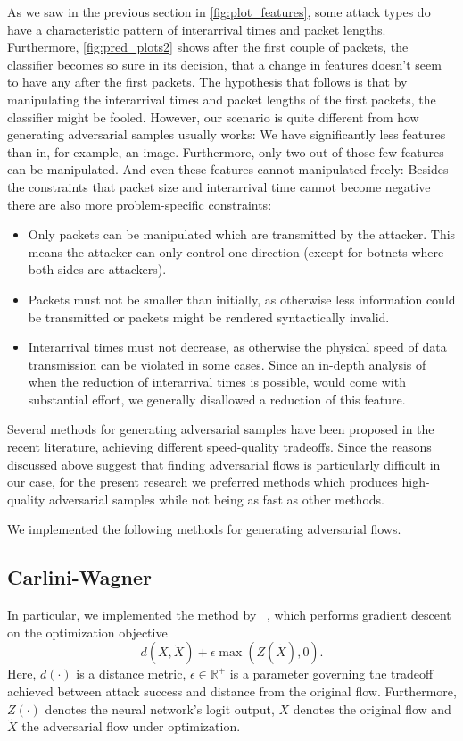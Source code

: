 \documentclass[sigconf,nonacm]{acmart}
\begin{document}
As we saw in the previous section in \autoref{fig:plot_features}, some attack types do have a characteristic pattern of interarrival times and packet lengths. Furthermore, \autoref{fig:pred_plots2} shows after the first couple of packets, the classifier becomes so sure in its decision, that a change in features doesn't seem to have any after the first packets. The hypothesis that follows is that by manipulating the interarrival times and packet lengths of the first packets, the classifier might be fooled. However, our scenario is quite different from how generating adversarial samples usually works: We have significantly less features than in, for example, an image. Furthermore, only two out of those few features can be manipulated. And even these features cannot manipulated freely: Besides the constraints that packet size and interarrival time cannot become negative there are also more problem-specific constraints:
\begin{itemize}
\item Only packets can be manipulated which are transmitted by the attacker. This means the attacker can only control one direction (except for botnets where both sides are attackers).
\item Packets must not be smaller than initially, as otherwise less information could be transmitted or packets might be rendered syntactically invalid.
\item Interarrival times must not decrease, as otherwise the physical speed of data transmission can be violated in some cases. Since an in-depth analysis of when the reduction of interarrival times is possible, would come with substantial effort, we generally disallowed a reduction of this feature.
\end{itemize}

Several methods for generating adversarial samples have been proposed in the recent literature, achieving different speed-quality tradeoffs. Since the reasons discussed above suggest that finding adversarial flows is particularly difficult in our case, for the present research we preferred methods which produces high-quality adversarial samples while not being as fast as other methods.

We implemented the following methods for generating adversarial flows.

\subsection{Carlini-Wagner}
In particular, we implemented the method by \citeauthor{carlini2017towards}~\cite{carlini2017towards}, which performs gradient descent on the optimization objective
\begin{equation} \label{eq:carliniWagner}
d(X,\tilde X) + \epsilon  \max(Z(\tilde X), 0).
\end{equation}
Here, $d(\cdot)$ is a distance metric, $\epsilon \in \mathbb R^+$ is a parameter governing the tradeoff achieved between attack success and distance from the original flow. Furthermore, $Z(\cdot)$ denotes the neural network's logit output, $X$ denotes the original flow and $\tilde X$ the adversarial flow under optimization.
\end{document}
